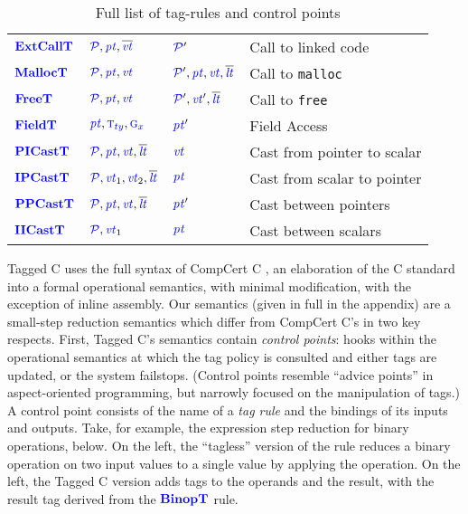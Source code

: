 \documentclass{llncs}
\begin{document}
{\begin{table}[t]
\begin{tabular}{|l|l|l|l|}
    \(\color{blue} \mathbf{ExtCallT}\)   & \(\mathcal{\color{blue} P}, \mathit{\color{blue} pt}, \overline{\mathit{\color{blue} vt}}\)      & \(\mathcal{\color{blue} P}'\)   & Call to linked code \\
    \(\color{blue} \mathbf{MallocT}\)    & \(\mathcal{\color{blue} P}, \mathit{\color{blue} pt}, \mathit{\color{blue} vt}\)       & \(\mathcal{\color{blue} P}',\mathit{\color{blue} pt},\mathit{\color{blue} vt},\overline{\mathit{\color{blue} lt}}\)    & Call to {\tt malloc} \\
    \(\color{blue} \mathbf{FreeT}\)      & \(\mathcal{\color{blue} P},\mathit{\color{blue} pt},\mathit{\color{blue} vt}\)         & \(\mathcal{\color{blue} P}',\mathit{\color{blue} vt}',\overline{\mathit{\color{blue} lt}}\)      & Call to {\tt free} \\
    \(\color{blue} \mathbf{FieldT}\)     & \(\mathit{\color{blue} pt}, {\color{blue} \textnormal{\sc t}_{ty}}, {\color{blue} \textnormal{\sc g}_{x}}\)        & \(\mathit{\color{blue} pt}'\)     & Field Access \\
    \(\color{blue} \mathbf{PICastT}\)    & \(\mathcal{\color{blue} P}, \mathit{\color{blue} pt}, \mathit{\color{blue} vt}, \overline{\mathit{\color{blue} lt}}\)       & \(\mathit{\color{blue} vt}\)    & Cast from pointer to scalar \\
    \(\color{blue} \mathbf{IPCastT}\)    & \(\mathcal{\color{blue} P}, \mathit{\color{blue} vt}_1, \mathit{\color{blue} vt}_2, \overline{\mathit{\color{blue} lt}}\)       & \(\mathit{\color{blue} pt}\)    & Cast from scalar to pointer \\
    \(\color{blue} \mathbf{PPCastT}\)    & \(\mathcal{\color{blue} P}, \mathit{\color{blue} pt}, \mathit{\color{blue} vt}, \overline{\mathit{\color{blue} lt}}\)       & \(\mathit{\color{blue} pt}'\)    & Cast between pointers \\
    \(\color{blue} \mathbf{IICastT}\)    & \(\mathcal{\color{blue} P}, \mathit{\color{blue} vt}_1\)       & \(\mathit{\color{blue} pt}\)    & Cast between scalars \\
    \hline
  \end{tabular}

  \caption{Full list of tag-rules and control points}
  \label{fig:controlpoints}
\end{table}



Tagged C uses the full syntax of CompCert C \cite{Leroy09:CompCert},
an elaboration of the C standard into a formal operational semantics,
with minimal modification, with the exception of inline assembly.
Our semantics (given in full in the appendix) are a small-step reduction
semantics which differ from CompCert C's in two key respects. First, Tagged C's semantics contain
{\em control points}: hooks within the
operational semantics at which the tag policy is consulted and either tags are updated, or the system
failstops. (Control points resemble ``advice points'' in aspect-oriented programming, but narrowly
focused on the manipulation of tags.) A control point consists of the name of a {\em tag rule}
and the bindings of its inputs and outputs. Take, for example, the expression step reduction
for binary operations, below. On the left, the ``tagless'' version of the rule reduces a
binary operation on two input values to a single value by applying the operation.
On the left, the Tagged C version adds tags to the operands and the result, with the result tag
derived from the \(\color{blue} \mathbf{BinopT}\) rule.

}
\end{document}
